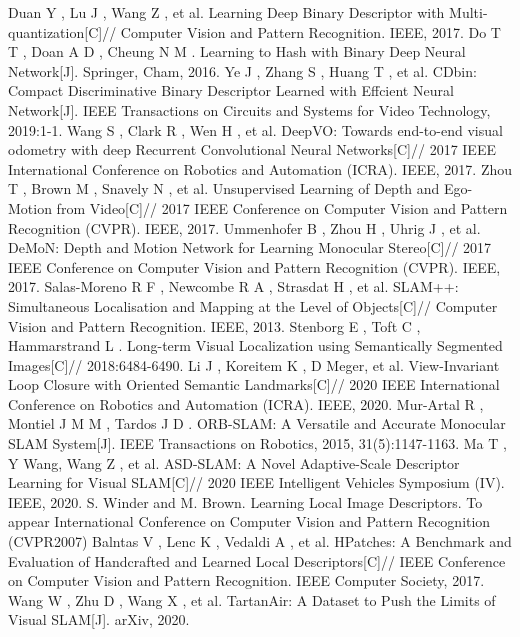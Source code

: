 \documentclass{svproc}
\begin{document}
\begin{thebibliography}{99}
 Duan Y ,  Lu J ,  Wang Z , et al. Learning Deep Binary Descriptor with Multi-quantization[C]// Computer Vision and Pattern Recognition. IEEE, 2017.
 Do T T ,  Doan A D ,  Cheung N M . Learning to Hash with Binary Deep Neural Network[J]. Springer, Cham, 2016.
 Ye J ,  Zhang S ,  Huang T , et al. CDbin: Compact Discriminative Binary Descriptor Learned with Effcient Neural Network[J]. IEEE Transactions on Circuits and Systems for Video Technology, 2019:1-1.
 Wang S ,  Clark R ,  Wen H , et al. DeepVO: Towards end-to-end visual odometry with deep Recurrent Convolutional Neural Networks[C]// 2017 IEEE International Conference on Robotics and Automation (ICRA). IEEE, 2017.
 Zhou T ,  Brown M ,  Snavely N , et al. Unsupervised Learning of Depth and Ego-Motion from Video[C]// 2017 IEEE Conference on Computer Vision and Pattern Recognition (CVPR). IEEE, 2017.
 Ummenhofer B ,  Zhou H ,  Uhrig J , et al. DeMoN: Depth and Motion Network for Learning Monocular Stereo[C]// 2017 IEEE Conference on Computer Vision and Pattern Recognition (CVPR). IEEE, 2017.
 Salas-Moreno R F ,  Newcombe R A ,  Strasdat H , et al. SLAM++: Simultaneous Localisation and Mapping at the Level of Objects[C]// Computer Vision and Pattern Recognition. IEEE, 2013.
 Stenborg E ,  Toft C ,  Hammarstrand L . Long-term Visual Localization using Semantically Segmented Images[C]// 2018:6484-6490.
 Li J ,  Koreitem K ,  D  Meger, et al. View-Invariant Loop Closure with Oriented Semantic Landmarks[C]// 2020 IEEE International Conference on Robotics and Automation (ICRA). IEEE, 2020.
 Mur-Artal R ,  Montiel J M M ,  Tardos J D . ORB-SLAM: A Versatile and Accurate Monocular SLAM System[J]. IEEE Transactions on Robotics, 2015, 31(5):1147-1163.
 Ma T ,  Y  Wang,  Wang Z , et al. ASD-SLAM: A Novel Adaptive-Scale Descriptor Learning for Visual SLAM[C]// 2020 IEEE Intelligent Vehicles Symposium (IV). IEEE, 2020.
 S. Winder and M. Brown. Learning Local Image Descriptors. To appear International Conference on Computer Vision and Pattern Recognition (CVPR2007)
 Balntas V ,  Lenc K ,  Vedaldi A , et al. HPatches: A Benchmark and Evaluation of Handcrafted and Learned Local Descriptors[C]// IEEE Conference on Computer Vision and Pattern Recognition. IEEE Computer Society, 2017.
 Wang W ,  Zhu D ,  Wang X , et al. TartanAir: A Dataset to Push the Limits of Visual SLAM[J]. arXiv, 2020.

\end{thebibliography}
\end{document}
